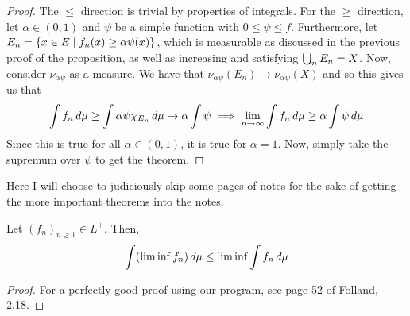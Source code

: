 \documentclass[11pt,leqno,oneside]{amsbook}
\numberwithin{thm}{section}
\begin{document}
\begin{proof}
  The \(\leq\) direction is trivial by properties of integrals. For
  the \(\geq\) direction, let \(\alpha \in (0,1)\) and \(\psi\) be
  a simple function with \(0 \leq \psi \leq f\). Furthermore, let
  \(E_n = \{x \in E \mid f_n(x) \geq \alpha \psi(x)\}\), which is
  measurable as discussed in the previous proof of the proposition, as
  well as increasing and satisfying \(\bigcup_n E_n = X\). Now,
  consider \(\nu_{\alpha \psi}\) as a measure. We have that
  \(\nu_{\alpha \psi}(E_n) \to \nu_{\alpha \psi}(X)\) and so this
  gives us that \[
    \int f_n \, d\mu \geq \int \alpha \psi \chi_{E_n} \, d\mu \to \alpha
    \int \psi \implies \lim_{n \to \infty} \int f_n \, d\mu \geq \alpha
    \int \psi \, d\mu
  \]
  Since this is true for all \(\alpha \in (0,1)\), it is true for
  \(\alpha = 1\). Now, simply take the supremum over \(\psi\) to get
  the theorem.
\end{proof}
Here I will choose to judiciously skip some pages of notes for the
sake of getting the more important theorems into the notes.
\begin{lem}
  Let \((f_n)_{n \geq 1} \in L^+\). Then, \[
    \int (\lim \inf f_n) \, d\mu \leq \lim \inf \int f_n \, d\mu
  \]
\end{lem}
\begin{proof}
  For a perfectly good proof using our program, see page 52 of
  Folland, 2.18.
\end{proof}
\end{document}
